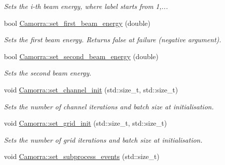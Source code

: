 \begin{DoxyCompactItemize}
\begin{DoxyCompactList}\small\item\em Sets the i-\/th beam energy, where label starts from 1,... \end{DoxyCompactList}\item 
\hypertarget{a00800_a6de95ee5984e0f2180101b7f76b90dd1}{
bool \hyperlink{a00800_a6de95ee5984e0f2180101b7f76b90dd1}{Camorra::set\_\-first\_\-beam\_\-energy} (double)}
\label{a00800_a6de95ee5984e0f2180101b7f76b90dd1}

\begin{DoxyCompactList}\small\item\em Sets the first beam energy. Returns false at failure (negative argument). \end{DoxyCompactList}\item 
bool \hyperlink{a00800_a1f6331ed932b7900c6a4e89d59526d60}{Camorra::set\_\-second\_\-beam\_\-energy} (double)
\begin{DoxyCompactList}\small\item\em Sets the second beam energy. \end{DoxyCompactList}\item 
\hypertarget{a00800_a7806d9dd46348bf9e97a288184f8f5c3}{
void \hyperlink{a00800_a7806d9dd46348bf9e97a288184f8f5c3}{Camorra::set\_\-channel\_\-init} (std::size\_\-t, std::size\_\-t)}
\label{a00800_a7806d9dd46348bf9e97a288184f8f5c3}

\begin{DoxyCompactList}\small\item\em Sets the number of channel iterations and batch size at initialisation. \end{DoxyCompactList}\item 
\hypertarget{a00800_ac158f04335b253127295e4a594f70a5c}{
void \hyperlink{a00800_ac158f04335b253127295e4a594f70a5c}{Camorra::set\_\-grid\_\-init} (std::size\_\-t, std::size\_\-t)}
\label{a00800_ac158f04335b253127295e4a594f70a5c}

\begin{DoxyCompactList}\small\item\em Sets the number of grid iterations and batch size at initialisation. \end{DoxyCompactList}\item 
\hypertarget{a00800_acf2bf549282ae12be161d55d81660323}{
void \hyperlink{a00800_acf2bf549282ae12be161d55d81660323}{Camorra::set\_\-subprocess\_\-events} (std::size\_\-t)}
\label{a00800_acf2bf549282ae12be161d55d81660323}


\end{DoxyCompactItemize}
